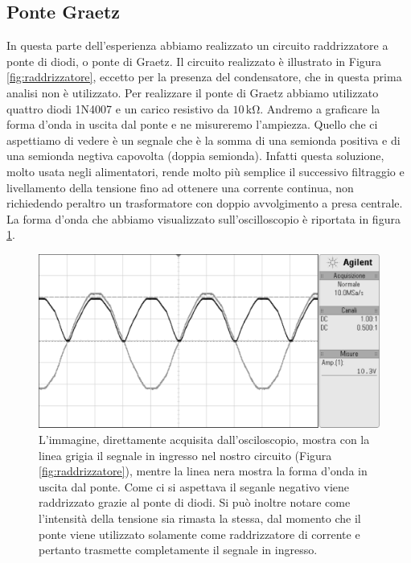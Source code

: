 \subsection*{Ponte Graetz}

In questa parte dell'esperienza abbiamo realizzato un circuito raddrizzatore a ponte di diodi, o ponte di Graetz. Il circuito realizzato è illustrato in Figura \ref{fig:raddrizzatore}, eccetto per la presenza del condensatore, che in questa prima analisi non è utilizzato.
Per realizzare il ponte di Graetz abbiamo utilizzato quattro diodi 1N4007 e un carico resistivo da $10\,\si{\kilo\ohm}$. Andremo a graficare la forma d'onda in uscita dal ponte e ne misureremo l'ampiezza.
Quello che ci aspettiamo di vedere è un segnale che è la somma di una semionda positiva e di una semionda negtiva capovolta (doppia semionda).
Infatti questa soluzione, molto usata negli alimentatori, rende molto più semplice il successivo filtraggio e livellamento della tensione fino ad ottenere una corrente continua, non richiedendo peraltro un trasformatore con doppio avvolgimento a presa centrale. La forma d'onda che abbiamo visualizzato sull'oscilloscopio è riportata in figura \ref{fig:graetz2}.

\begin{figure}
    \includegraphics[width=\textwidth]{n2_bianco.pdf}
    \caption{L'immagine, direttamente acquisita dall'osciloscopio, mostra con la linea grigia il segnale in ingresso nel nostro circuito (Figura \ref{fig:raddrizzatore}), mentre la linea nera mostra la forma d'onda in uscita dal ponte. Come ci si aspettava il seganle negativo viene raddrizzato grazie al ponte di diodi. Si può inoltre notare come l'intensità della tensione sia rimasta la stessa, dal momento che il ponte viene utilizzato solamente come raddrizzatore di corrente e pertanto trasmette completamente il segnale in ingresso.}
    \label{fig:graetz2}
\end{figure}

